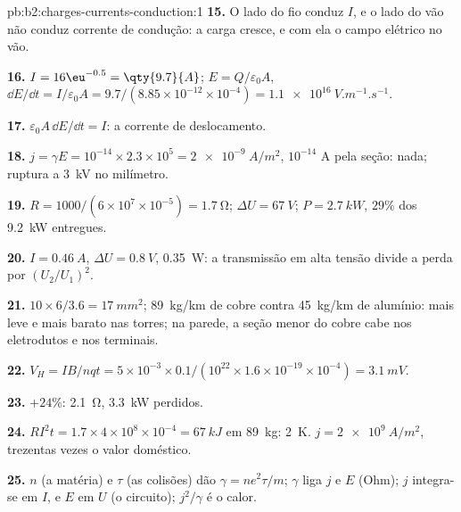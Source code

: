 \begin{solution}{pb:b2:charges-currents-conduction:1}
\textbf{15.} O lado do fio conduz $I$, e o lado do vão não conduz corrente
de condução: a carga cresce, e com ela o campo elétrico no vão.

\textbf{16.} $I = 16\eu^{-0.5} = \qty{9.7}{A}$; $E = Q/\varepsilon_0A$, $\dd E/\dd t = I/\varepsilon_0A
= 9.7/(8.85 \times 10^{-12} \times 10^{-4}) = \qty{1.1e16}{V.m^{-1}.s^{-1}}$.

\textbf{17.} $\varepsilon_0A\,\dd E/\dd t = I$: a corrente de deslocamento.

\textbf{18.} $j = \gamma E = 10^{-14} \times 2.3 \times 10^5 = \qty{2e-9}{A/m^2}$, $10^{-14}$ A
pela seção: nada; ruptura a \qty{3}{kV} no milímetro.

\textbf{19.} $R = 1000/(6 \times 10^7 \times 10^{-5}) = \qty{1.7}{\ohm}$; $\Delta U = \qty{67}{V}$; $P =
\qty{2.7}{kW}$, $29\%$ dos \qty{9.2}{kW} entregues.

\textbf{20.} $I = \qty{0.46}{A}$, $\Delta U = \qty{0.8}{V}$, \qty{0.35}{W}: a transmissão em
alta tensão divide a perda por $(U_2/U_1)^2$.

\textbf{21.} $10 \times 6/3.6 = \qty{17}{mm^2}$; \qty{89}{kg/km} de cobre contra
\qty{45}{kg/km} de alumínio: mais leve e mais barato nas torres; na parede,
a seção menor do cobre cabe nos eletrodutos e nos terminais.

\textbf{22.} $V_H = IB/nqt = 5 \times 10^{-3} \times 0.1/(10^{22} \times 1.6 \times 10^{-19} \times 10^{-4}) =
\qty{3.1}{mV}$.

\textbf{23.} $+24\%$: \qty{2.1}{\ohm}, \qty{3.3}{kW} perdidos.

\textbf{24.} $RI^2t = 1.7 \times 4 \times 10^8 \times 10^{-4} = \qty{67}{kJ}$ em \qty{89}{kg}: \qty{2}{K}.
$j = \qty{2e9}{A/m^2}$, trezentas vezes o valor doméstico.

\textbf{25.} $n$ (a matéria) e $\tau$ (as colisões) dão $\gamma = ne^2\tau/m$;
$\gamma$ liga $j$ e $E$ (Ohm); $j$ integra-se em $I$, e $E$ em $U$ (o
circuito); $j^2/\gamma$ é o calor.
\end{solution}
